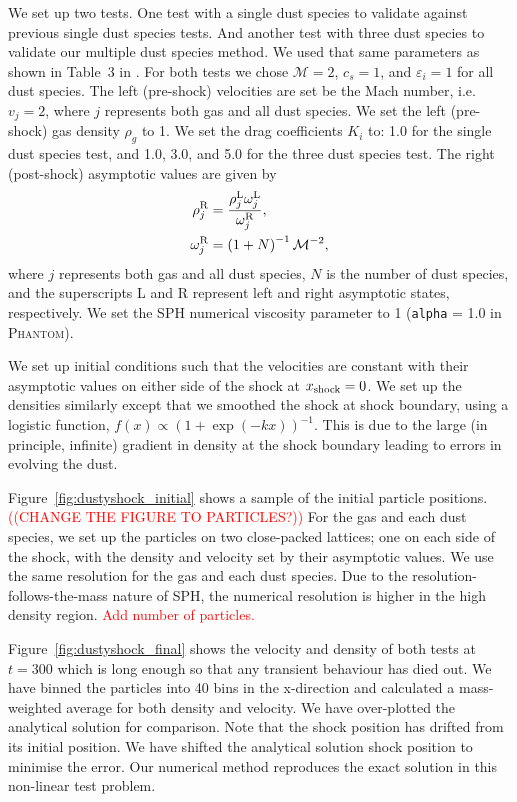 \documentclass[fleqn,usenatbib]{mnras}
\begin{document}
We set up two tests. One test with a single dust species to validate against
previous single dust species tests. And another test with three dust species to
validate our multiple dust species method. We used that same parameters as shown
in Table~3 in \citet{Benitez-Llambay2019ApJS..241...25B}. For both tests we
chose \(\mathcal{M} = 2\), \(c_s = 1\), and \(\varepsilon_i = 1\) for all dust
species. The left (pre-shock) velocities are set be the Mach number, i.e. \(v_j=
2\), where \(j\) represents both gas and all dust species. We set the left
(pre-shock) gas density \(\rho_g\) to 1. We set the drag coefficients \(K_i\)
to: 1.0 for the single dust species test, and 1.0, 3.0, and 5.0 for the three
dust species test. The right (post-shock) asymptotic values are given by
%
\begin{align}
   \rho_{j}^{\rm R} &=
      \frac{\rho_{j}^{\rm L} \omega_{j}^{\rm L}} {\omega_{j}^{\rm R}}, \\
   \omega_j^{\rm R} &= \left(1 + N \right)^{-1} \mathcal{M}^{-2},
\end{align}
%
where \(j\) represents both gas and all dust species, \(N\) is the number of
dust species, and the superscripts L and R represent left and right asymptotic
states, respectively. We set the SPH numerical viscosity parameter to 1
(\texttt{alpha} = 1.0 in \textsc{Phantom}).

We set up initial conditions such that the velocities are constant with their
asymptotic values on either side of the shock at \(x_{\rm shock} = 0\). We set
up the densities similarly except that we smoothed the shock at shock boundary,
using a logistic function, \(f(x) \propto {(1 + \exp(-kx))}^{-1}\). This is due
to the large (in principle, infinite) gradient in density at the shock boundary
leading to errors in evolving the dust.

Figure~\ref{fig:dustyshock_initial} shows a sample of the initial particle
positions. \textcolor{red}{((CHANGE THE FIGURE TO PARTICLES?))} For the gas and
each dust species, we set up the particles on two close-packed lattices; one on
each side of the shock, with the density and velocity set by their asymptotic
values. We use the same resolution for the gas and each dust species. Due to the
resolution-follows-the-mass nature of SPH, the numerical resolution is higher in
the high density region. \textcolor{red}{Add number of particles.}

Figure~\ref{fig:dustyshock_final} shows the velocity and density of both tests
at \(t = 300\) which is long enough so that any transient behaviour has died
out. We have binned the particles into 40 bins in the x-direction and calculated
a mass-weighted average for both density and velocity. We have over-plotted the
analytical solution for comparison. Note that the shock position has drifted
from its initial position. We have shifted the analytical solution shock
position to minimise the error. Our numerical method reproduces the exact
solution in this non-linear test problem.
\end{document}
